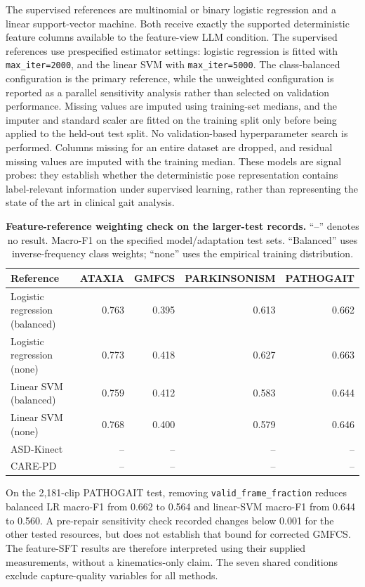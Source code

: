 The supervised references are multinomial or binary logistic regression and a linear support-vector machine. Both receive exactly the supported deterministic feature columns available to the feature-view LLM condition. The supervised references use prespecified estimator settings:
logistic regression is fitted with \texttt{max\_iter=2000}, and the
linear SVM with \texttt{max\_iter=5000}. The class-balanced
configuration is the primary reference, while the unweighted
configuration is reported as a parallel sensitivity analysis rather
than selected on validation performance. Missing values are imputed
using training-set medians, and the imputer and standard scaler are
fitted on the training split only before being applied to the held-out
test split. No validation-based hyperparameter search is performed. Columns missing for an entire dataset are dropped, and residual missing values are imputed with the training median. These models are signal probes: they establish whether the deterministic pose representation contains label-relevant information under supervised learning, rather than representing the state of the art in clinical gait analysis.

\begin{table}[H]
\centering
\caption{\textbf{Feature-reference weighting check on the larger-test records.} ``--'' denotes no result. Macro-F1 on the specified model/adaptation test sets. ``Balanced'' uses inverse-frequency class weights; ``none'' uses the empirical training distribution.}
\label{tab:core_linear_refs}
\small
\begin{tabular}{lrrrr}
\toprule
Reference & ATAXIA & GMFCS & PARKINSONISM & PATHOGAIT \\
\midrule
Logistic regression (balanced) & 0.763 & 0.395 & 0.613 & 0.662 \\
Logistic regression (none) & 0.773 & 0.418 & 0.627 & 0.663 \\
Linear SVM (balanced) & 0.759 & 0.412 & 0.583 & 0.644 \\
Linear SVM (none) & 0.768 & 0.400 & 0.579 & 0.646 \\
ASD-Kinect & -- & -- & -- & -- \\
CARE-PD & -- & -- & -- & -- \\
\bottomrule
\end{tabular}
\end{table}

On the 2,181-clip PATHOGAIT test, removing \texttt{valid\_frame\_fraction} reduces balanced LR macro-F1 from 0.662 to 0.564 and linear-SVM macro-F1 from 0.644 to 0.560. A pre-repair sensitivity check recorded changes below 0.001 for the other tested resources, but does not establish that bound for corrected GMFCS. The feature-SFT results are therefore interpreted using their supplied measurements, without a kinematics-only claim. The seven shared conditions exclude capture-quality variables for all methods.

